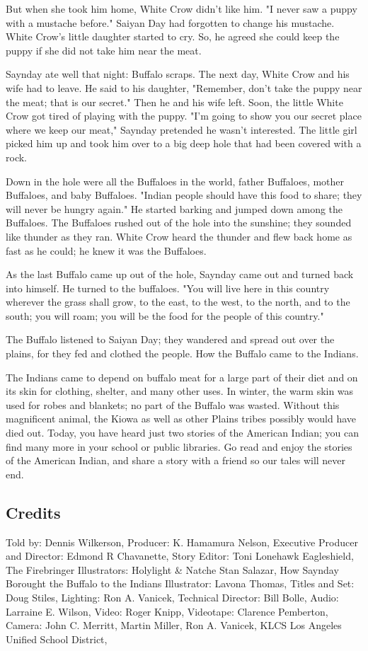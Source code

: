 But when she took him home, White Crow didn't like him. "I never saw a puppy with a mustache before." Saiyan Day had forgotten to change his mustache. White Crow's little daughter started to cry. So, he agreed she could keep the puppy if she did not take him near the meat.

Saynday ate well that night: Buffalo scraps. The next day, White Crow and his wife had to leave. He said to his daughter, "Remember, don't take the puppy near the meat; that is our secret." Then he and his wife left. Soon, the little White Crow got tired of playing with the puppy. "I'm going to show you our secret place where we keep our meat," Saynday pretended he wasn't interested. The little girl picked him up and took him over to a big deep hole that had been covered with a rock.

Down in the hole were all the Buffaloes in the world, father Buffaloes, mother Buffaloes, and baby Buffaloes. "Indian people should have this food to share; they will never be hungry again." He started barking and jumped down among the Buffaloes. The Buffaloes rushed out of the hole into the sunshine; they sounded like thunder as they ran. White Crow heard the thunder and flew back home as fast as he could; he knew it was the Buffaloes.

As the last Buffalo came up out of the hole, Saynday came out and turned back into himself. He turned to the buffaloes. "You will live here in this country wherever the grass shall grow, to the east, to the west, to the north, and to the south; you will roam; you will be the food for the people of this country."

The Buffalo listened to Saiyan Day; they wandered and spread out over the plains, for they fed and clothed the people. How the Buffalo came to the Indians.

The Indians came to depend on buffalo meat for a large part of their diet and on its skin for clothing, shelter, and many other uses. In winter, the warm skin was used for robes and blankets; no part of the Buffalo was wasted. Without this magnificent animal, the Kiowa as well as other Plains tribes possibly would have died out. Today, you have heard just two stories of the American Indian; you can find many more in your school or public libraries. Go read and enjoy the stories of the American Indian, and share a story with a friend so our tales will never end.

\subsection{Credits}

Told by: Dennis Wilkerson,
Producer: K. Hamamura Nelson,
Executive Producer and Director: Edmond R Chavanette,
Story Editor: Toni Lonehawk Eagleshield,
The Firebringer Illustrators: Holylight \& Natche Stan Salazar,
How Saynday Borought the Buffalo to the Indians Illustrator: Lavona Thomas,
Titles and Set: Doug Stiles,
Lighting: Ron A. Vanicek,
Technical Director: Bill Bolle,
Audio: Larraine E. Wilson,
Video: Roger Knipp,
Videotape: Clarence Pemberton,
Camera: John C. Merritt, Martin Miller, Ron A. Vanicek,
KLCS Los Angeles Unified School District,